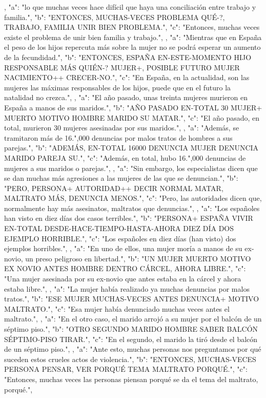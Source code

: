 ,
{
"a": "lo que muchas veces hace difícil que haya una conciliación entre trabajo y familia.",
"b": "ENTONCES, MUCHAS-VECES PROBLEMA QUÉ-?, TRABAJO, FAMILIA UNIR BIEN PROBLEMA.",
"c": "Entonces, muchas veces existe el problema de unir bien familia y trabajo.",
}
,
{
"a": "Mientras que en España el peso de los hijos repercuta más sobre la mujer no se podrá esperar un aumento de la fecundidad.",
"b": "ENTONCES, ESPAÑA EN-ESTE-MOMENTO HIJO RESPONSABLE MÁS QUIÉN-? MUJER+, POSIBLE FUTURO MUJER NACIMIENTO++ CRECER-NO.",
"c": "En España, en la actualidad, son las mujeres las máximas responsables de los hijos, puede que en el futuro la natalidad no crezca.",
}
,
{
"a": "El año pasado, unas treinta mujeres murieron en España a manos de sus maridos.",
"b": "AÑO PASADO EN-TOTAL 30 MUJER+ MUERTO MOTIVO HOMBRE MARIDO SU MATAR.",
"c": "El año pasado, en total, murieron 30 mujeres asesinadas por sus maridos.",
}
,
{
"a": "Además, se tramitaron más de 16.",000 denuncias por malos tratos de hombres a sus parejas.",
"b": "ADEMÁS, EN-TOTAL 16000 DENUNCIA MUJER DENUNCIA MARIDO PAREJA SU.",
"c": "Además, en total, hubo 16.",000 denuncias de mujeres a sus maridos o parejas.",
}
,
{
"a": "Sin embargo, los especialistas dicen que se dan muchas más agresiones a las mujeres de las que se denuncian.",
"b": "PERO, PERSONA+ AUTORIDAD++ DECIR NORMAL MATAR, MALTRATO MÁS, DENUNCIA MENOS.",
"c": "Pero, las autoridades dicen que, normalmente hay más asesinatos, maltratos que denuncias.",
}
,
{
"a": "Los españoles han visto en diez días dos casos terribles.",
"b": "PERSONA+ ESPAÑA VIVIR EN-TOTAL DESDE-HACE-TIEMPO-HASTA-AHORA DIEZ DÍA DOS EJEMPLO HORRIBLE.",
"c": "Los españoles en diez días (han visto) dos ejemplos horribles.",
}
,
{
"a": "En uno de ellos, una mujer moría a manos de su ex-novio, un preso peligroso en libertad.",
"b": "UN MUJER MUERTO MOTIVO EX NOVIO ANTES HOMBRE DENTRO CÁRCEL, AHORA LIBRE.",
"c": "Una mujer asesinada por su ex-novio que antes estaba en la cárcel y ahora estaba libre.",
}
,
{
"a": "La mujer había realizado ya muchas denuncias por malos tratos.",
"b": "ESE MUJER MUCHAS-VECES ANTES DENUNCIA+ MOTIVO MALTRATO.",
"c": "Esa mujer había denunciado muchas veces antes el maltrato.",
}
,
{
"a": "En el otro caso, el marido arrojó a su mujer por el balcón de un séptimo piso.",
"b": "OTRO SEGUNDO MARIDO HOMBRE SABER BALCÓN SÉPTIMO-PISO TIRAR.",
"c": "En el segundo, el marido la tiró desde el balcón de un séptimo piso.",
}
,
{
"a": "Ante esto, muchas personas nos preguntamos por qué suceden estos crueles actos de violencia.",
"b": "ENTONCES, MUCHAS-VECES PERSONA PENSAR, VER PORQUÉ TEMA MALTRATO PORQUÉ.",
"c": "Entonces, muchas veces las personas piensan porqué se da el tema del maltrato, porqué.",
}
